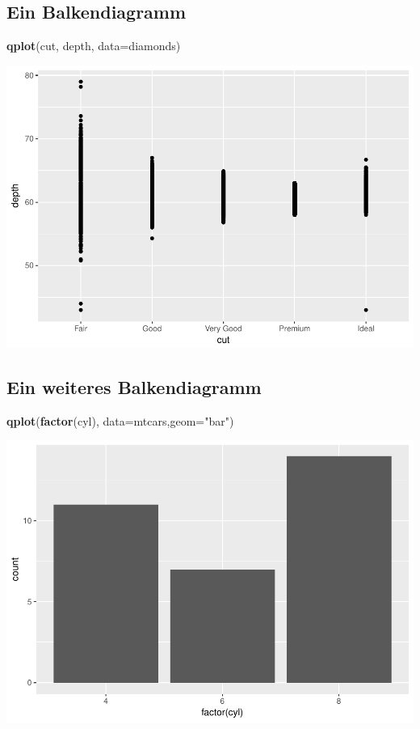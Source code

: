 \documentclass[]{article}
\newenvironment{Shaded}{\begin{snugshade}}{\end{snugshade}}
\newcommand{\KeywordTok}[1]{\textcolor[rgb]{0.13,0.29,0.53}{\textbf{{#1}}}}
\newcommand{\DataTypeTok}[1]{\textcolor[rgb]{0.13,0.29,0.53}{{#1}}}
\newcommand{\StringTok}[1]{\textcolor[rgb]{0.31,0.60,0.02}{{#1}}}
\newcommand{\NormalTok}[1]{{#1}}
\begin{document}
\subsection{Ein Balkendiagramm}\label{ein-balkendiagramm}

\begin{Shaded}
\begin{Highlighting}[]
\KeywordTok{qplot}\NormalTok{(cut, depth, }\DataTypeTok{data=}\NormalTok{diamonds)}
\end{Highlighting}
\end{Shaded}

\includegraphics{Intro_Datenanalyse1_files/figure-latex/unnamed-chunk-221-1.pdf}

\subsection{Ein weiteres
Balkendiagramm}\label{ein-weiteres-balkendiagramm}

\begin{Shaded}
\begin{Highlighting}[]
\KeywordTok{qplot}\NormalTok{(}\KeywordTok{factor}\NormalTok{(cyl), }\DataTypeTok{data=}\NormalTok{mtcars,}\DataTypeTok{geom=}\StringTok{"bar"}\NormalTok{)}
\end{Highlighting}
\end{Shaded}

\includegraphics{Intro_Datenanalyse1_files/figure-latex/unnamed-chunk-222-1.pdf}
\end{document}
